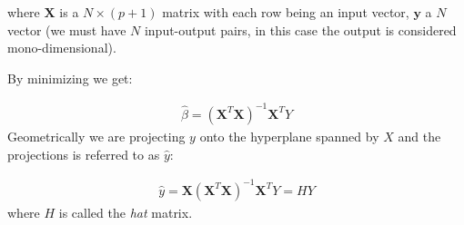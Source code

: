 \documentclass[12pt, letterpaper]{article}
\theoremstyle{definition}
\newcommand{\X}{\mathrm{\mathbf{X}}}
\begin{document}
where $\bm{X}$ is a $N \times (p+1)$ matrix with each row being an input vector, $\bm{y}$ a $N$ vector (we must have $N$ input-output pairs, in this case the output is considered mono-dimensional).

By minimizing we get:

\begin{align}
\hat{\beta} = \left( \X^T \X\right)^{-1} \X^TY
\label{OLSRegression}
\end{align}
Geometrically we are projecting $y$ onto the hyperplane spanned by $X$ and the projections is referred to as $\hat{y}$:

\begin{align}
\hat{y} =\X \left( \X^T \X\right)^{-1} \X^T Y = H Y
\end{align}
where $H$ is called the \textit{hat} matrix.


\end{document}
